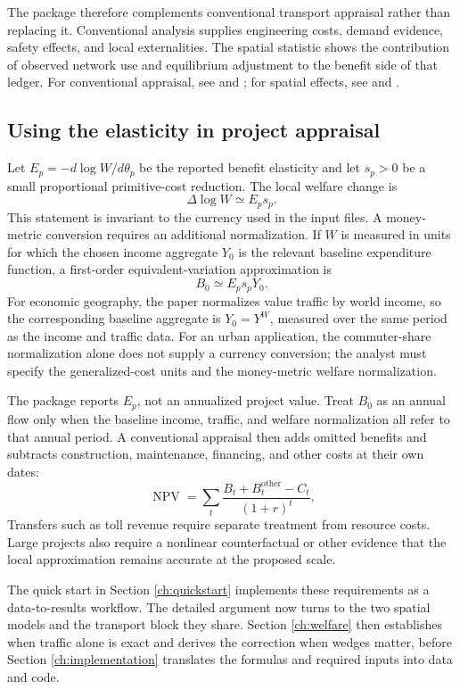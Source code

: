 
The package therefore complements conventional transport appraisal rather
than replacing it. Conventional analysis supplies engineering costs, demand
evidence, safety effects, and local externalities. The spatial statistic shows
the contribution of observed network use and equilibrium adjustment to the
benefit side of that ledger. For conventional appraisal, see
\citet{SmallVerhoefLindsey2024} and \citet{dePalmaEtAl2011Handbook}; for
spatial effects, see \citet{ReddingTurner2015} and
\citet{donaldson2025transport}.

\subsection{Using the elasticity in project appraisal}

Let \(E_p=-d\log W/d\theta_p\) be the reported benefit elasticity and let
\(s_p>0\) be a small proportional primitive-cost reduction. The local welfare
change is
\[
 \Delta\log W \simeq E_p s_p.
\]
This statement is invariant to the currency used in the input files. A
money-metric conversion requires an additional normalization. If \(W\) is
measured in units for which the chosen income aggregate \(Y_0\) is the relevant
baseline expenditure function, a first-order equivalent-variation
approximation is
\[
 B_0 \simeq E_p s_p Y_0.
\]
For economic geography, the paper normalizes value traffic by world income,
so the corresponding baseline aggregate is \(Y_0=Y^W\), measured over the
same period as the income and traffic data. For an urban application, the
commuter-share normalization alone does not supply a currency conversion; the
analyst must specify the generalized-cost units and the money-metric welfare
normalization.

The package reports \(E_p\), not an annualized project value. Treat \(B_0\) as
an annual flow only when the baseline income, traffic, and welfare
normalization all refer to that annual period. A conventional appraisal then
adds omitted benefits and subtracts construction, maintenance, financing, and
other costs at their own dates:
\[
 \operatorname{NPV}
 =
 \sum_t
 \frac{B_t+B_t^{\mathrm{other}}-C_t}{(1+r)^t}.
\]
Transfers such as toll revenue require separate treatment from resource costs.
Large projects also require a nonlinear counterfactual or other evidence that
the local approximation remains accurate at the proposed scale.

The quick start in Section \ref{ch:quickstart} implements these requirements as a
data-to-results workflow. The detailed argument now turns to the two spatial
models and the transport block they share. Section \ref{ch:welfare} then
establishes when traffic alone is exact and derives the correction when
wedges matter, before Section \ref{ch:implementation} translates the formulas
and required inputs into data and code.
